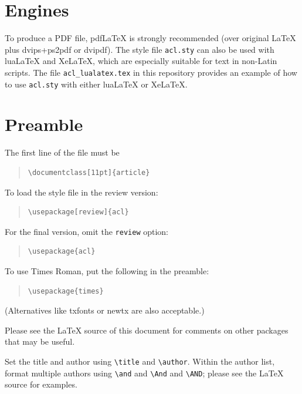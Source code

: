 \documentclass[11pt, a4paper, logo, copyright]{dmml}
\begin{document}
\section{Engines}

To produce a PDF file, pdf\LaTeX{} is strongly recommended (over original \LaTeX{} plus dvips+ps2pdf or dvipdf).
The style file \texttt{acl.sty} can also be used with
lua\LaTeX{} and
Xe\LaTeX{}, which are especially suitable for text in non-Latin scripts.
The file \texttt{acl\_lualatex.tex} in this repository provides
an example of how to use \texttt{acl.sty} with either
lua\LaTeX{} or
Xe\LaTeX{}.

\section{Preamble}

The first line of the file must be
\begin{quote}
\begin{verbatim}
\documentclass[11pt]{article}
\end{verbatim}
\end{quote}

To load the style file in the review version:
\begin{quote}
\begin{verbatim}
\usepackage[review]{acl}
\end{verbatim}
\end{quote}
For the final version, omit the \verb|review| option:
\begin{quote}
\begin{verbatim}
\usepackage{acl}
\end{verbatim}
\end{quote}

To use Times Roman, put the following in the preamble:
\begin{quote}
\begin{verbatim}
\usepackage{times}
\end{verbatim}
\end{quote}
(Alternatives like txfonts or newtx are also acceptable.)

Please see the \LaTeX{} source of this document for comments on other packages that may be useful.

Set the title and author using \verb|\title| and \verb|\author|. Within the author list, format multiple authors using \verb|\and| and \verb|\And| and \verb|\AND|; please see the \LaTeX{} source for examples.
\end{document}
